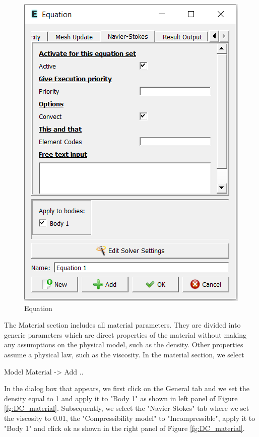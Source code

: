 \begin{figure}[H]
\centering
\includegraphics[scale=0.7]{DC_equation}
\caption{Equation}\label{fg:DC_equation}
\end{figure}

The Material section includes all material parameters. They are divided into generic parameters which are direct properties of the material without making any assumptions on the physical model, such as the density. Other properties assume a physical law, such as the viscosity. 
In the material section, we select 

\ttbegin
Model
  Material -> Add .. 
\ttend  

In the dialog box that appears, we first click on the General tab and we set the density equal to 1 and apply it to "Body 1" as shown in left panel of Figure \ref{fg:DC_material}.
Subsequently, we select the "Navier-Stokes" tab where we set the viscosity to 0.01, the "Compressibility model" to "Incompressible", apply it to "Body 1" and click ok as shown in the right panel of Figure \ref{fg:DC_material}.

